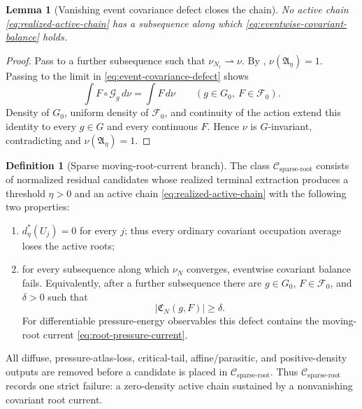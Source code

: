 \documentclass[11pt]{amsart}
\numberwithin{equation}{section}
\theoremstyle{plain}
\newtheorem{lemma}[lemma]{Lemma}
\theoremstyle{definition}
\newtheorem{definition}[definition]{Definition}
\theoremstyle{remark}
\newcommand{\Csparse}{\mathcal C_{\mathrm{sparse\text{-}root}}}
\begin{document}
\begin{lemma}[Vanishing event covariance defect closes the chain]
\label{lem:vanishing-event-current-exclusion}
No active chain \eqref{eq:realized-active-chain} has a subsequence along which
\eqref{eq:eventwise-covariant-balance} holds.
\end{lemma}

\begin{proof}
Pass to a further subsequence such that \(\nu_{N_\ell}\rightharpoonup\nu\).
By ,
\(\nu(\mathfrak A_\eta)=1\).  Passing to the limit in
\eqref{eq:event-covariance-defect} shows
\[
 \int F\circ\mathscr G_g\,d\nu=\int F\,d\nu
 \qquad(g\in G_0,\ F\in\mathscr F_0).
\]
Density of \(G_0\), uniform density of \(\mathscr F_0\), and continuity of
the action extend this identity to every \(g\in G\) and every continuous
\(F\).  Hence \(\nu\) is \(G\)-invariant, contradicting
 and
\(\nu(\mathfrak A_\eta)=1\).
\end{proof}

\begin{definition}[Sparse moving-root-current branch]
\label{def:sparse-moving-root-current-branch}
The class \(\Csparse\) consists of normalized residual candidates whose
realized terminal extraction produces a threshold \(\eta>0\) and an active
chain \eqref{eq:realized-active-chain} with the following two properties:
\begin{enumerate}[label=\textup{(S\arabic*)}]
 \item \(d_\eta^*(U_j)=0\) for every \(j\); thus every ordinary covariant
 occupation average loses the active roots;
 \item for every subsequence along which \(\nu_N\) converges, eventwise
 covariant balance fails.  Equivalently, after a further subsequence there
 are \(g\in G_0\), \(F\in\mathscr F_0\), and \(\delta>0\) such that
 \begin{equation}\label{eq:persistent-event-current}
   |\mathfrak C_N(g,F)|\ge\delta.
 \end{equation}
 For differentiable pressure-energy observables this defect contains the
 moving-root current \eqref{eq:root-pressure-current}.
\end{enumerate}
All diffuse, pressure-atlas-loss, critical-tail, affine/parasitic, and
positive-density outputs are removed before a candidate is placed in
\(\Csparse\).  Thus \(\Csparse\) records one strict failure: a zero-density
active chain sustained by a nonvanishing covariant root current.
\end{definition}
\end{document}
